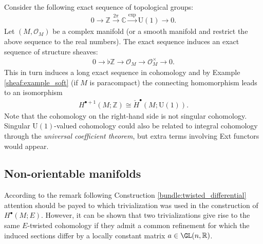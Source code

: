     \begin{property}
        Consider the following exact sequence of topological groups:
        \begin{gather}
            0\longrightarrow\mathbb{Z}\overset{2\pi}{\longrightarrow}\mathbb{C}\overset{\exp}{\longrightarrow}\mathrm{U}(1)\longrightarrow0.
        \end{gather}
        Let $(M,\mathcal{O}_M)$ be a complex manifold (or a smooth manifold and restrict the above sequence to the real numbers). The exact sequence induces an exact sequence of structure sheaves:
        \begin{gather}
            0\longrightarrow\flat\mathbb{Z}\longrightarrow\mathcal{O}_M\longrightarrow\mathcal{O}_M^\times\longrightarrow0.
        \end{gather}
        This in turn induces a long exact sequence in cohomology and by Example \ref{sheaf:example_soft} (if $M$ is paracompact) the connecting homomorphism leads to an isomorphism
        \begin{gather}
            \label{bundle:U1_cohomology_isomorphism}
            H^{\bullet+1}(M;\mathbb{Z})\cong\check{H}^\bullet(M;\mathrm{U}(1)).
        \end{gather}
        Note that the cohomology on the right-hand side is not singular cohomology. Singular $\mathrm{U}(1)$-valued cohomology could also be related to integral cohomology through the \textit{universal coefficient theorem}, but extra terms involving Ext functors would appear.
    \end{property}

\subsection{Non-orientable manifolds}

    \begin{remark}
        According to the remark following Construction \ref{bundle:twisted_differential} attention should be payed to which trivialization was used in the construction of $H^\bullet(M;E)$. However, it can be shown that two trivializations give rise to the same $E$-twisted cohomology if they admit a common refinement for which the induced sections differ by a locally constant matrix $a\in\GL(n,\mathbb{R})$.
    \end{remark}

